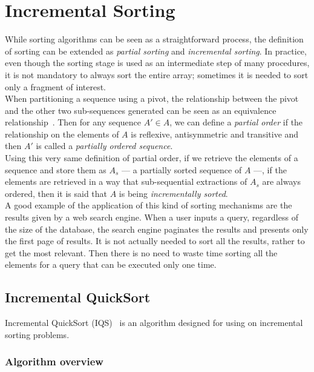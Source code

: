 
\section{Incremental Sorting}
\label{SEC:INCREMENTAL_SORTING}

While sorting algorithms can be seen as a straightforward process, the definition of sorting can be extended as \textit{partial sorting} and \textit{incremental sorting}. In practice, even though the sorting stage is used as an intermediate step of many procedures, it is not mandatory to always sort the entire array; sometimes it is needed to sort only a fragment of interest.\\

When partitioning a sequence using a pivot, the relationship between the pivot and the other two sub-sequences generated can be seen as an equivalence relationship~\cite{10.5555/1614191}. Then for any sequence $A' \in A$, we can define a \textit{partial order} if the relationship on the elements of $A$ is reflexive, antisymmetric and transitive and then $A'$ is called a \textit{partially ordered sequence}.\\

Using this very same definition of partial order, if we retrieve the elements of a sequence and store them as $A_s$ --- a partially sorted sequence of $A$ ---, if the elements are retrieved in a way that sub-sequential extractions of $A_s$ are always ordered, then it is said that $A$ is being \textit{incrementally sorted}.\\

A good example of the application of this kind of sorting mechanisms  are the results given by a web search engine. When a user inputs a query, regardless of the size of the database, the search engine paginates the results and presents only the first page of results. It is not actually needed to sort all the results, rather to get the most relevant. Then there is no need to waste time sorting all the elements for a query that can be executed only one time.\\

\subsection{Incremental QuickSort}
Incremental QuickSort (IQS)~\cite{Navarro_Paredes_2010} is an algorithm designed for using on incremental sorting problems.\\

\subsubsection{Algorithm overview}

